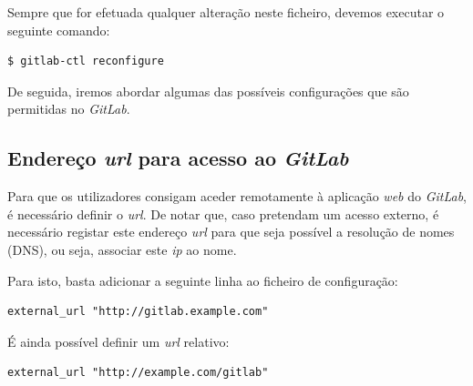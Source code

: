 \documentclass[12pt,a4paper]{article}
\begin{document}
Sempre que for efetuada qualquer alteração neste ficheiro, devemos executar o seguinte comando:
\begin{verbatim}
$ gitlab-ctl reconfigure
\end{verbatim}

De seguida, iremos abordar algumas das possíveis configurações que são permitidas no \emph{GitLab}.


\subsection{Endereço \emph{url} para acesso ao \emph{GitLab}}

Para que os utilizadores consigam aceder remotamente à aplicação \emph{web} do \emph{GitLab}, é necessário definir o \emph{url}. De notar que, caso pretendam um acesso externo, é necessário registar este endereço \emph{url} para que seja possível a resolução de nomes (DNS), ou seja, associar este \emph{ip} ao nome. 

Para isto, basta adicionar a seguinte linha ao ficheiro de configuração:

\begin{verbatim}
external_url "http://gitlab.example.com"
\end{verbatim}

É ainda possível definir um \emph{url} relativo: 

\begin{verbatim}
external_url "http://example.com/gitlab"
\end{verbatim}
\end{document}
